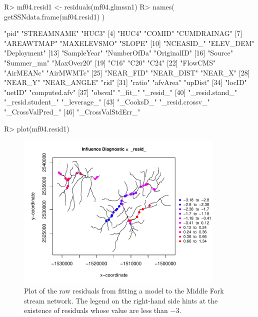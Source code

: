 \documentclass[nojss]{jss}
\renewenvironment{Schunk}{\vspace{\topsep}}{\vspace{\topsep}}
\begin{document}
\begin{Schunk}
\begin{Sinput}
R> mf04.resid1 <- residuals(mf04.glmssn1)
R> names( getSSNdata.frame(mf04.resid1) )
\end{Sinput}
\begin{Soutput}
 [1] "pid"              "STREAMNAME"       "HUC3"            
 [4] "HUC4"             "COMID"            "CUMDRAINAG"      
 [7] "AREAWTMAP"        "MAXELEVSMO"       "SLOPE"           
[10] "NCEASID_"         "ELEV_DEM"         "Deployment"      
[13] "SampleYear"       "NumberOfDa"       "OriginalID"      
[16] "Source"           "Summer_mn"        "MaxOver20"       
[19] "C16"              "C20"              "C24"             
[22] "FlowCMS"          "AirMEANc"         "AirMWMTc"        
[25] "NEAR_FID"         "NEAR_DIST"        "NEAR_X"          
[28] "NEAR_Y"           "NEAR_ANGLE"       "rid"             
[31] "ratio"            "afvArea"          "upDist"          
[34] "locID"            "netID"            "computed.afv"    
[37] "obsval"           "_fit_"            "_resid_"         
[40] "_resid.stand_"    "_resid.student_"  "_leverage_"      
[43] "_CooksD_"         "_resid.crossv_"   "_CrossValPred_"  
[46] "_CrossValStdErr_"
\end{Soutput}
\begin{Sinput}
R> plot(mf04.resid1)
\end{Sinput}
\end{Schunk}

\begin{figure}[htbp]
  \begin{center}
    \includegraphics[keepaspectratio=true, width = 100mm]{Figures/jss984Fig-Model1}
    \caption{Plot of the raw residuals from fitting a model to the Middle Fork stream network. The legend on the right-hand side hints at the existence of residuals whose value are less than $-3$. \label{Model1}}
  \end{center}
\end{figure}
\end{document}
